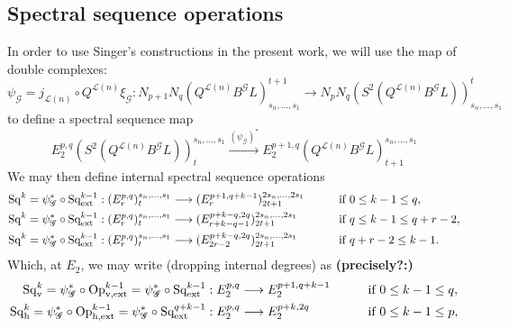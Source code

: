 \documentclass[11pt]{amsart}
\theoremstyle{plain}
\theoremstyle{definition}
\renewcommand{\to}{\longrightarrow}
\newcommand{\scrG}{\mathscr{G}}
\newcommand{\calL}{\mathcal{L}}
\theoremstyle{plain}
\newcommand{\BSW}{{\scrG}}
\newcommand{\BSWres}{B^\BSW}%
\newcommand{\ExtCohOp}{\textup{Sq}_\textup{ext}}
\newcommand{\vExtCohOp}{\textup{Op}_\textup{v,ext}}
\newcommand{\hExtCohOp}{\textup{Op}_\textup{h,ext}}
\newcommand{\Sq}{\mathrm{Sq}}
\newcommand{\Sqh}{\mathrm{Sq}_\textup{h}}
\newcommand{\Sqv}{\mathrm{Sq}_\textup{v}}
\begin{document}
\begin{Composite functor spectral sequences}
\subsection{Spectral sequence operations}


In order to use Singer's constructions in the present work, we will use the map of double complexes:
\[\psi_{\BSW}=j_{\calL(n)}\circ Q^{\calL(n)}\xi_\BSW:N_{p+1}N_q(Q^{\calL(n)}\BSWres L)_{s_n,\ldots,s_1}^{t+1}\to N_{p}N_q(S^2(Q^{\calL(n)}\BSWres L))_{s_n,\ldots,s_1}^{t}\]
to define a spectral sequence map
\[E_2^{p,q}(S^2(Q^{\calL(n)}\BSWres L))^{s_n,\ldots,s_1}_t\overset{(\psi_\BSW)^*}{\to} E_2^{p+1,q}(Q^{\calL(n)}\BSWres L)^{s_n,\ldots,s_1}_{t+1}\]
We may then define internal spectral sequence operations
\begin{alignat*}{2}
\Sq^k=\psi_{\BSW}^*\circ\ExtCohOp^{k-1}:(E^{p,q}_r)^{s_n,\ldots,s_1}_t&\to (E^{p+1,q+k-1}_r)^{2s_n,\ldots,2s_1}_{2t+1}&\qquad&\text{if }0\leq k-1 \leq q,\\
\Sq^k=\psi_{\BSW}^*\circ\ExtCohOp^{k-1}:(E^{p,q}_r)^{s_n,\ldots,s_1}_t&\to (E^{p+k-q,2q}_{r+k-q-1})^{2s_n,\ldots,2s_1}_{2t+1}&\qquad&\text{if }q\leq k-1\leq q+r-2,\\
\Sq^k=\psi_{\BSW}^*\circ\ExtCohOp^{k-1}:(E^{p,q}_r)^{s_n,\ldots,s_1}_t&\to (E^{p+k-q,2q}_{2r-2})^{2s_n,\ldots,2s_1}_{2t+1}&\qquad&\text{if }q+r-2\leq k-1.
\end{alignat*}
Which, at $E_2$, we may write (dropping internal degrees) as \textbf{(precisely?:)}
\begin{alignat*}{2}
\Sqv^k=\psi_{\BSW}^*\circ\vExtCohOp^{k-1}= \psi_{\BSW}^*\circ\ExtCohOp^{k-1}:E^{p,q}_2&\to E^{p+1,q+k-1}_2&\qquad&\text{if }0\leq k-1 \leq q,\\
\Sqh^k=\psi_{\BSW}^*\circ\hExtCohOp^{k-1}= \psi_{\BSW}^*\circ\ExtCohOp^{q+k-1}:E^{p,q}_2&\to E^{p+k,2q}_2&\qquad&\text{if }0\leq k-1 \leq p,
\end{alignat*}


\end{Composite functor spectral sequences}
\end{document}

